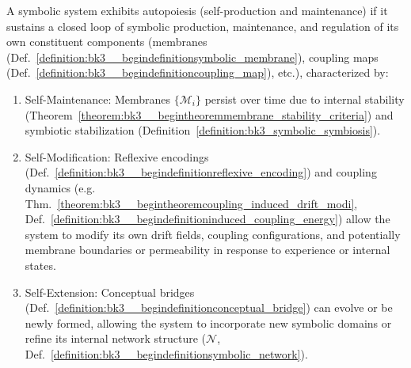 \begin{definition} \label{definition:bk3__begindefinitionsymbolic_autopoiesis}
A symbolic system exhibits autopoiesis (self-production and maintenance) if it sustains a closed loop of symbolic production, maintenance, and regulation of its own constituent components (membranes (Def.~\ref{definition:bk3__begindefinitionsymbolic_membrane}), coupling maps (Def.~\ref{definition:bk3__begindefinitioncoupling_map}), etc.), characterized by:
\begin{enumerate}
    \item Self-Maintenance: Membranes $\{\mathcal{M}_i\}$ persist over time due to internal stability (Theorem~\ref{theorem:bk3__begintheoremmembrane_stability_criteria}) and symbiotic stabilization (Definition~\ref{definition:bk3_symbolic_symbiosis}).
    \item Self-Modification: Reflexive encodings (Def.~\ref{definition:bk3__begindefinitionreflexive_encoding}) and coupling dynamics (e.g. Thm.~\ref{theorem:bk3__begintheoremcoupling_induced_drift_modi}, Def.~\ref{definition:bk3__begindefinitioninduced_coupling_energy}) allow the system to modify its own drift fields, coupling configurations, and potentially membrane boundaries or permeability in response to experience or internal states.
    \item Self-Extension: Conceptual bridges (Def.~\ref{definition:bk3__begindefinitionconceptual_bridge}) can evolve or be newly formed, allowing the system to incorporate new symbolic domains or refine its internal network structure ($\mathcal{N}$, Def.~\ref{definition:bk3__begindefinitionsymbolic_network}).
\end{enumerate}
\end{definition}

